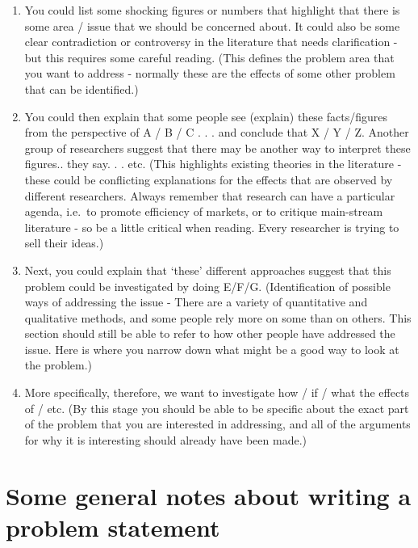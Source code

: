 \documentclass[
]{book}
\begin{document}
\begin{enumerate}
\def\labelenumi{\arabic{enumi}.}
\item
  You could list some shocking figures or numbers that highlight that
  there is some area / issue that we should be concerned about. It
  could also be some clear contradiction or controversy in the
  literature that needs clarification - but this requires some careful
  reading. (This defines the problem area that you want to address -
  normally these are the effects of some other problem that can be
  identified.)
\item
  You could then explain that some people see (explain) these
  facts/figures from the perspective of A / B / C . . . and conclude
  that X / Y / Z. Another group of researchers suggest that there may
  be another way to interpret these figures.. they say. . . etc. (This
  highlights existing theories in the literature - these could be
  conflicting explanations for the effects that are observed by
  different researchers. Always remember that research can have a
  particular agenda, i.e.~to promote efficiency of markets, or to
  critique main-stream literature - so be a little critical when
  reading. Every researcher is trying to sell their ideas.)
\item
  Next, you could explain that `these' different approaches suggest
  that this problem could be investigated by doing E/F/G.
  (Identification of possible ways of addressing the issue - There are
  a variety of quantitative and qualitative methods, and some people
  rely more on some than on others. This section should still be able
  to refer to how other people have addressed the issue. Here is where
  you narrow down what might be a good way to look at the problem.)
\item
  More specifically, therefore, we want to investigate how / if / what
  the effects of / etc. (By this stage you should be able to be
  specific about the exact part of the problem that you are interested
  in addressing, and all of the arguments for why it is interesting
  should already have been made.)
\end{enumerate}

\hypertarget{some-general-notes-about-writing-a-problem-statement}{%
\section{Some general notes about writing a problem statement}\label{some-general-notes-about-writing-a-problem-statement}}
\end{document}
